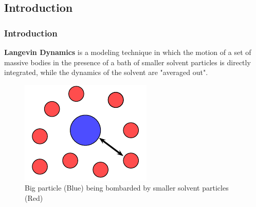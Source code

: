 \documentclass[a4paper,10pt]{beamer}
\begin{document}
	\begin{frame}
		\section{Introduction}
		\frametitle{Introduction}
		
		\quad \textbf{Langevin Dynamics} is a modeling technique in which the motion of a set of massive bodies in the presence of a bath of smaller solvent particles is directly integrated, while the dynamics of the solvent are "averaged out".
		
		\begin{figure}[h]
			\includegraphics[width=0.35\linewidth]{./Plots/HeatBath.pdf}
			\caption{Big particle (Blue) being bombarded by smaller solvent particles (Red)}
			\label{eq:HeatBath}
		\end{figure}
		
	\end{frame}
		

		
\end{document}
